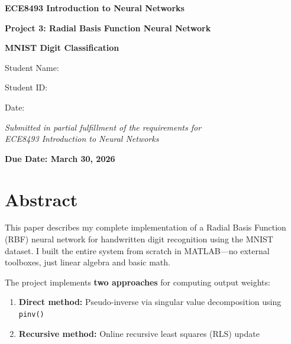 \documentclass[12pt]{article}
\begin{document}
	
	\begin{titlepage}
		\centering
		\vspace*{2cm}
		\Huge
		\textbf{ECE8493 Introduction to Neural Networks}
		
		\vspace{1cm}
		\LARGE
		\textbf{Project 3: Radial Basis Function Neural Network}
		
		\vspace{0.5cm}
		\textbf{MNIST Digit Classification}
		
		\vspace{3cm}
		\Large
		Student Name: \underline{\hspace{5cm}}
		
		\vspace{0.5cm}
		Student ID: \underline{\hspace{5cm}}
		
		\vspace{0.5cm}
		Date: \underline{\hspace{5cm}}
		
		\vspace{3cm}
		\normalsize
		\textit{Submitted in partial fulfillment of the requirements for \\
			ECE8493 Introduction to Neural Networks}
		
		\vspace{1cm}
		\textbf{Due Date: March 30, 2026}
	\end{titlepage}
	
	\section*{Abstract}
	
	This paper describes my complete implementation of a Radial Basis Function (RBF) neural network for handwritten digit recognition using the MNIST dataset. I built the entire system from scratch in MATLAB—no external toolboxes, just linear algebra and basic math. 
	
	The project implements \textbf{two approaches} for computing output weights:
	\begin{enumerate}
		\item \textbf{Direct method:} Pseudo-inverse via singular value decomposition using \texttt{pinv()}
		\item \textbf{Recursive method:} Online recursive least squares (RLS) update
	\end{enumerate}
	
\end{document}
